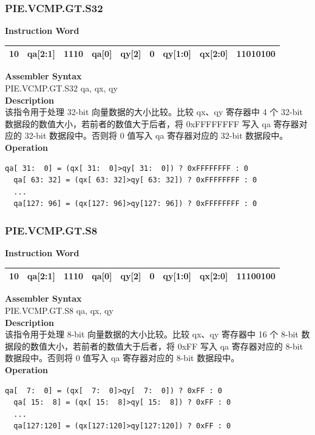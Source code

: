 \newpage
\subsubsection{PIE.VCMP.GT.S32}\label{instruction:PIEVCMPGTS32}
\setlength\tabcolsep{6pt}
\textbf{Instruction Word} \\
\begin{tabular}{|c|c|c|c|c|c|c|c|c|}
	\hline
	10 & qa[2:1] & 1110 & qa[0] & qy[2] & 0 & qy[1:0] & qx[2:0] & 11010100 \\
	\hline
\end{tabular}

\textbf{Assembler Syntax} \\
PIE.VCMP.GT.S32 qa, qx, qy \\
\textbf{Description} \\
该指令用于处理 32-bit 向量数据的大小比较。比较 qx、qy 寄存器中 4 个 32-bit 数据段的数值大小，若前者的数值大于后者，将 0xFFFFFFFF 写入 qa 寄存器对应的 32-bit 数据段中。否则将 0 值写入 qa 寄存器对应的 32-bit 数据段中。\\
\textbf{Operation}
\begin{lstlisting}[escapeinside=`?]
  qa[ 31:  0] = (qx[ 31:  0]>qy[ 31:  0]) ? 0xFFFFFFFF : 0
  qa[ 63: 32] = (qx[ 63: 32]>qy[ 63: 32]) ? 0xFFFFFFFF : 0
  ...
  qa[127: 96] = (qx[127: 96]>qy[127: 96]) ? 0xFFFFFFFF : 0
\end{lstlisting}

\newpage
\subsubsection{PIE.VCMP.GT.S8}\label{instruction:PIEVCMPGTS8}
\setlength\tabcolsep{6pt}
\textbf{Instruction Word} \\
\begin{tabular}{|c|c|c|c|c|c|c|c|c|}
	\hline
	10 & qa[2:1] & 1110 & qa[0] & qy[2] & 0 & qy[1:0] & qx[2:0] & 11100100 \\
	\hline
\end{tabular}

\textbf{Assembler Syntax} \\
PIE.VCMP.GT.S8 qa, qx, qy \\
\textbf{Description} \\
该指令用于处理 8-bit 向量数据的大小比较。比较 qx、qy 寄存器中 16 个 8-bit 数据段的数值大小，若前者的数值大于后者，将 0xFF 写入 qa 寄存器对应的 8-bit 数据段中。否则将 0 值写入 qa 寄存器对应的 8-bit 数据段中。\\
\textbf{Operation}
\begin{lstlisting}[escapeinside=`?]
  qa[  7:  0] = (qx[  7:  0]>qy[  7:  0]) ? 0xFF : 0
  qa[ 15:  8] = (qx[ 15:  8]>qy[ 15:  8]) ? 0xFF : 0
  ...
  qa[127:120] = (qx[127:120]>qy[127:120]) ? 0xFF : 0
\end{lstlisting}


